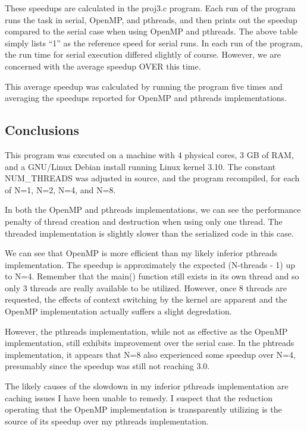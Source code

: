 \documentclass[conference]{IEEEtran}
\begin{document}
These speedups are calculated in the proj3.c program. Each run of the 
program runs the task in serial, OpenMP, and pthreads, and then prints out 
the speedup compared to the serial case when using OpenMP and pthreads. The 
above table simply lists ``1'' as the reference speed for serial runs. In each 
run of the program, the run time for serial execution differed slightly of 
course. However, we are concerned with the average speedup OVER this time.

This average speedup was calculated by running the program five times and 
averaging the speedups reported for OpenMP and pthreads implementations.

\subsection{Conclusions}

This program was executed on a machine with 4 physical cores, 3 GB of RAM, 
and a GNU/Linux Debian install running Linux kernel 3.10. The constant 
NUM\_THREADS was adjusted in source, and the program recompiled, for each 
of N=1, N=2, N=4, and N=8.

In both the OpenMP and pthreads implementations, we can see the performance 
penalty of thread creation and destruction when using only one thread. The 
threaded implementation is slightly slower than the serialized code in this 
case.

We can see that OpenMP is more efficient than my likely inferior pthreads
implementation. The speedup is approximately the expected (N-threads - 1) up to
N=4. Remember that the main() function still exists in its own thread and so
only 3 threads are really available to be utilized. However, once 8 threads are
requested, the effects of context switching by the kernel are apparent and the
OpenMP implementation actually suffers a slight degredation.

However, the pthreads implementation, while not as effective as the OpenMP 
implementation, still exhibits improvement over the serial case. In the 
phtreads implementation, it appears that N=8 also experienced some 
speedup over N=4, presumably since the speedup was still not reaching 3.0. 

The likely causes of the slowdown in my inferior pthreads implementation 
are caching issues I have been unable to remedy. I suspect that the reduction 
operating that the OpenMP implementation is transparently utilizing is the 
source of its speedup over my pthreads implementation.
\end{document}
